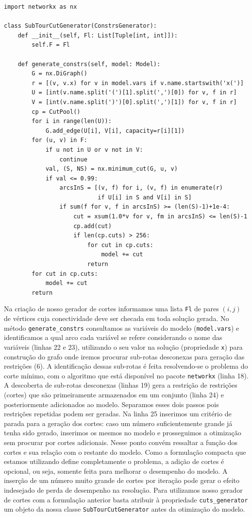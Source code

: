 \documentclass[a4paper,11pt,fleqn]{article}
\begin{document}
{\small
\begin{lstlisting}
import networkx as nx

class SubTourCutGenerator(ConstrsGenerator):
    def __init__(self, Fl: List[Tuple[int, int]]):
        self.F = Fl

    def generate_constrs(self, model: Model):
        G = nx.DiGraph()
        r = [(v, v.x) for v in model.vars if v.name.startswith('x(')]
        U = [int(v.name.split('(')[1].split(',')[0]) for v, f in r]
        V = [int(v.name.split(')')[0].split(',')[1]) for v, f in r]
        cp = CutPool()
        for i in range(len(U)):
            G.add_edge(U[i], V[i], capacity=r[i][1])
        for (u, v) in F:
            if u not in U or v not in V:
                continue
            val, (S, NS) = nx.minimum_cut(G, u, v)
            if val <= 0.99:
                arcsInS = [(v, f) for i, (v, f) in enumerate(r)
                           if U[i] in S and V[i] in S]
                if sum(f for v, f in arcsInS) >= (len(S)-1)+1e-4:
                    cut = xsum(1.0*v for v, fm in arcsInS) <= len(S)-1
                    cp.add(cut)
                    if len(cp.cuts) > 256:
                        for cut in cp.cuts:
                            model += cut
                        return
        for cut in cp.cuts:
            model += cut
        return
\end{lstlisting}}

Na criação de nosso gerador de cortes informamos uma lista \texttt{Fl} de pares $(i,j)$ de vértices cuja conectividade deve ser checada em toda solução gerada. No método \texttt{generate\_constrs} consultamos as variáveis do modelo (\texttt{model.vars}) e identificamos a qual arco cada variável se refere considerando o nome das variáveis (linhas 22 e  23), utilizando o seu valor na solução (propriedade \texttt{x}) para construção do grafo onde iremos procurar sub-rotas desconexas para geração das restrições (6). A identificação dessas sub-rotas é feita resolvendo-se o problema do corte mínimo, com o algoritmo que está disponível no pacote \texttt{networkx} (linha 18). A descoberta de sub-rotas desconexas (linhas 19) gera a restrição de restrições (cortes) que são primeiramente armazenados em um conjunto (linha 24) e posteriormente adicionados ao modelo. Separamos esses dois passos pois restrições repetidas podem ser geradas. Na linha 25 inserimos um critério de parada para a geração dos cortes: caso um número suficientemente grande já tenha sido gerado, inserimos os mesmos no modelo e prosseguimos a otimização sem procurar por cortes adicionais. Nesse ponto convém ressaltar a função dos cortes e sua relação com o restante do modelo. Como a formulação compacta que estamos utilizando define completamente o problema, a adição de cortes é opcional, ou seja, somente feita para melhorar o desempenho do modelo. A inserção de um número muito grande de cortes por iteração pode gerar o efeito indesejado de perda de desempenho na resolução. Para utilizamos nosso gerador de cortes com a formulação anterior basta atribuir à propriedade \texttt{cuts\_generator} um objeto da nossa classe \texttt{SubTourCutGenerator} antes da otimização do modelo.
\end{document}
